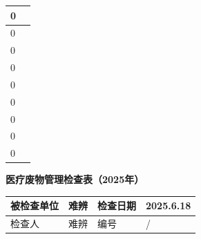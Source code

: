 \documentclass[UTF8,10pt,a4paper,fontset=fandol]{ctexart}
\newcommand{\fieldvalue}[1]{#1}
\newcommand{\handwritten}[1]{#1}
\begin{document}
\begin{tabularx}{\textwidth}{|p{}|X|}
\fieldvalue{\handwritten{0}} &
\\
\hline
\fieldvalue{\handwritten{0}} &
\\
\hline
\fieldvalue{\handwritten{0}} &
\\
\hline
\fieldvalue{\handwritten{0}} &
\\
\hline
\fieldvalue{\handwritten{0}} &
\\
\hline
\fieldvalue{\handwritten{0}} &
\\
\hline
\fieldvalue{\handwritten{0}} &
\\
\hline
\fieldvalue{\handwritten{0}} &
\\
\hline
\fieldvalue{\handwritten{0}} &
\\
\hline
\end{tabularx}


\newpage

\begin{center}
\textbf{医疗废物管理检查表（2025年）}
\end{center}

\noindent
\begin{tabularx}{\textwidth}{|l|X|l|X|}
\hline
被检查单位 & 
\fieldvalue{\handwritten{难辨}} &
检查日期 &
\fieldvalue{\handwritten{2025.6.18}}
\\
\hline
检查人 &
\fieldvalue{\handwritten{难辨}} &
编号 &
\fieldvalue{\handwritten{/}}
\\
\hline
\end{tabularx}

\vspace{0.5em}
\end{document}
